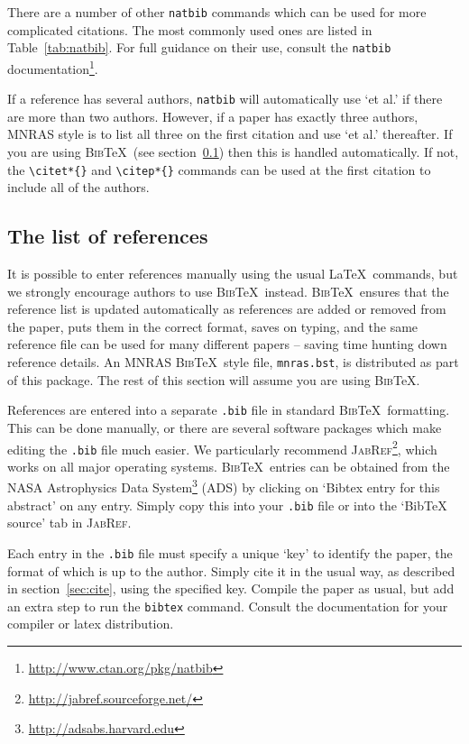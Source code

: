 \documentclass[a4paper,fleqn,usenatbib,useAMS]{mnras}
\newcommand{\bibtex}{\textsc{Bib}\!\TeX} %
\begin{document}
There are a number of other \verb'natbib' commands which can be used for more complicated citations.
The most commonly used ones are listed in Table~\ref{tab:natbib}.
For full guidance on their use, consult the \verb'natbib' documentation\footnote{\url{http://www.ctan.org/pkg/natbib}}.

If a reference has several authors, \verb'natbib' will automatically use `et al.' if there are more than two authors. However, if a paper has exactly three authors, MNRAS style is to list all three on the first citation and use `et al.' thereafter. If you are using \bibtex\ (see section~\ref{sec:ref_list}) then this is handled automatically. If not, the \verb'\citet*{}' and \verb'\citep*{}' commands can be used at the first citation to include all of the authors.

\subsection{The list of references}
\label{sec:ref_list}

It is possible to enter references manually using the usual \LaTeX\ commands, but we strongly encourage authors to use \bibtex\ instead.
\bibtex\ ensures that the reference list is updated automatically as references are added or removed from the paper, puts them in the correct format, saves on typing, and the same reference file can be used for many different papers -- saving time hunting down reference details.
An MNRAS \bibtex\ style file, \verb'mnras.bst', is distributed as part of this package.
The rest of this section will assume you are using \bibtex.

References are entered into a separate \verb'.bib' file in standard \bibtex\ formatting.
This can be done manually, or there are several software packages which make editing the \verb'.bib' file much easier.
We particularly recommend \textsc{JabRef}\footnote{\url{http://jabref.sourceforge.net/}}, which works on all major operating systems.
\bibtex\ entries can be obtained from the NASA Astrophysics Data System\footnote{\label{foot:ads}\url{http://adsabs.harvard.edu}} (ADS) by clicking on `Bibtex entry for this abstract' on any entry.
Simply copy this into your \verb'.bib' file or into the `BibTeX source' tab in \textsc{JabRef}.

Each entry in the \verb'.bib' file must specify a unique `key' to identify the paper, the format of which is up to the author.
Simply cite it in the usual way, as described in section~\ref{sec:cite}, using the specified key.
Compile the paper as usual, but add an extra step to run the \texttt{bibtex} command.
Consult the documentation for your compiler or latex distribution.
\end{document}
